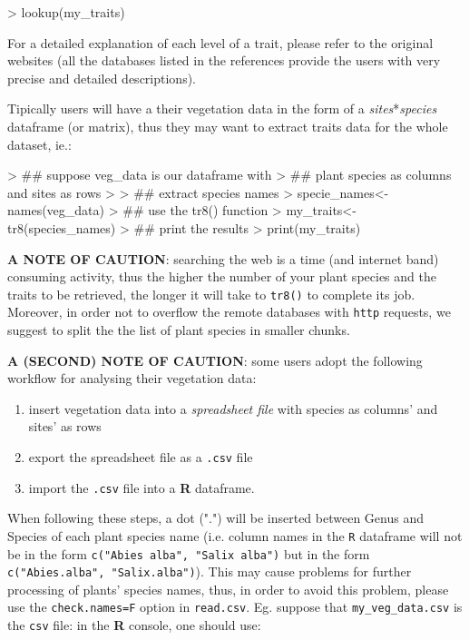 \documentclass{article}
\begin{document}
\begin{Schunk}
\begin{Sinput}
> lookup(my_traits)
\end{Sinput}
\end{Schunk}

  For a detailed explanation of each level of a trait, please refer to
  the original websites (all the databases listed in the references
  provide the users with very precise and detailed descriptions).


   Tipically users will have a their vegetation data in the form of a
   \textit{sites}*\textit{species} dataframe (or matrix), thus they
   may want to extract traits data for the whole dataset, ie.:
   
\begin{Schunk}
\begin{Sinput}
> ## suppose veg_data is our dataframe with
> ## plant species as columns and sites as rows
> 
> ## extract species names
> specie_names<-names(veg_data)
> ## use the tr8() function
> my_traits<-tr8(species_names)
> ## print the results
> print(my_traits)
\end{Sinput}
\end{Schunk}
  
  \textbf{A NOTE OF CAUTION}: searching the web is a time (and
  internet band) consuming activity, thus the higher the number of
  your plant species and the traits to be retrieved, the longer it will take to \texttt{tr8()} to complete its job. Moreover, in order
  not to overflow the remote databases with \texttt{http} requests, we
  suggest to split the the list of plant species in smaller chunks.

  \textbf{A (SECOND) NOTE OF CAUTION}: some users adopt the following workflow for analysing their vegetation data:

  \begin{enumerate}
  \item insert vegetation data into a \textit{spreadsheet file} with species as
  columns' and sites' as rows
\item export the spreadsheet file as a \texttt{.csv} file
\item import the \texttt{.csv} file into a \textbf{R} dataframe.
  \end{enumerate}
  
  When following these steps, a dot (".") will be inserted between
Genus and Species of each plant species name (i.e. column names in the
\texttt{R} dataframe will not be in the form \texttt{c("Abies alba", "Salix
alba")} but in the form  \texttt{c("Abies.alba", "Salix.alba")}).
This may cause problems for further processing of plants'
species names, thus, in order to avoid this problem, please use the \texttt{check.names=F}
  option in \texttt{read.csv}. Eg. suppose that
  \texttt{my\_veg\_data.csv} is the \texttt{csv} file: in the
  \textbf{R} console, one should use:
\end{document}
